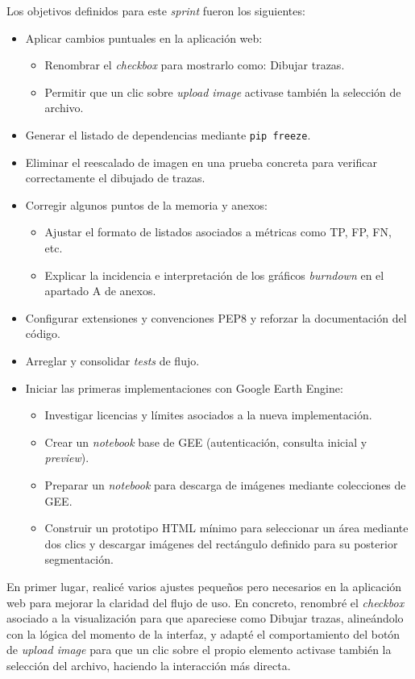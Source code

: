 Los objetivos definidos para este \textit{sprint} fueron los siguientes:
\begin{itemize}
	\item Aplicar cambios puntuales en la aplicación web:
	\begin{itemize}
		\item Renombrar el \textit{checkbox} para mostrarlo como: Dibujar trazas.
		\item Permitir que un clic sobre \textit{upload image} activase también la selección de archivo.
	\end{itemize}
	\item Generar el listado de dependencias mediante \texttt{pip freeze}.
	\item Eliminar el reescalado de imagen en una prueba concreta para verificar correctamente el dibujado de trazas.
	\item Corregir algunos puntos de la memoria y anexos:
	\begin{itemize}
		\item Ajustar el formato de listados asociados a métricas como TP, FP, FN, etc.
		\item Explicar la incidencia e interpretación de los gráficos \textit{burndown} en el apartado A de anexos.
	\end{itemize}
	\item Configurar extensiones y convenciones PEP8 y reforzar la documentación del código.
	\item Arreglar y consolidar \textit{tests} de flujo.
	\item Iniciar las primeras implementaciones con Google Earth Engine:
	\begin{itemize}
		\item Investigar licencias y límites asociados a la nueva implementación.
		\item Crear un \textit{notebook} base de GEE (autenticación, consulta inicial y \textit{preview}).
		\item Preparar un \textit{notebook} para descarga de imágenes mediante colecciones de GEE.
		\item Construir un prototipo HTML mínimo para seleccionar un área mediante dos clics y descargar imágenes del rectángulo definido para su posterior segmentación.
	\end{itemize}
\end{itemize}

En primer lugar, realicé varios ajustes pequeños pero necesarios en la aplicación web para mejorar la claridad del flujo de uso. En concreto, renombré el \textit{checkbox} asociado a la visualización para que apareciese como Dibujar trazas, alineándolo con la lógica del momento de la interfaz, y adapté el comportamiento del botón de \textit{upload image} para que un clic sobre el propio elemento activase también la selección del archivo, haciendo la interacción más directa.

